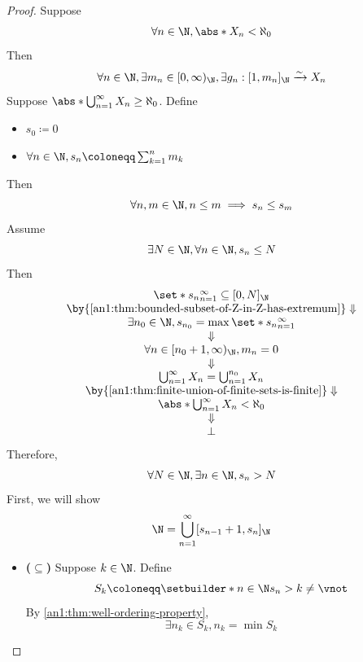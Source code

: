 \begin{proof}
  Suppose
  \[
    \forall n \in \N, \abs*{X_{n}} < \aleph_{0}
  \]
  Then
  \[
    \forall n \in \N, \exists m_{n} \in [0, \infty)_{\N}, \exists g_{n}: [1, m_{n}]_{\N} \xrightarrow{\sim} X_{n}
  \]
  Suppose $\abs*{\bigcup_{n = 1}^{\infty} X_{n}} \geq \aleph_{0}$. Define
  \begin{itemize}
    \item $s_{0} \coloneqq 0$
    \item $\forall n \in \N, s_{n} \coloneqq \sum_{k = 1}^{n} m_{k}$
  \end{itemize}
  Then
  \[
    \forall n, m \in \N, n \leq m \implies s_{n} \leq s_{m}
  \]
  Assume
  \[
    \exists N \in \N, \forall n \in \N, s_{n} \leq N
  \]
  Then
  \[
    \begin{array}{c}
      \set*{s_{n}}_{n = 1}^{\infty} \subseteq [0, N]_{\N}                  \\
      \by{\Cref{an1:thm:bounded-subset-of-Z-in-Z-has-extremum}} \Downarrow \\
      \exists n_{0} \in \N, s_{n_{0}} = \max \set*{s_{n}}_{n = 1}^{\infty} \\
      \Downarrow                                                           \\
      \forall n \in [n_{0} + 1, \infty)_{\N}, m_{n} = 0                    \\
      \Downarrow                                                           \\
      \bigcup_{n = 1}^{\infty} X_{n} = \bigcup_{n = 1}^{n_{0}} X_{n}       \\
      \by{\Cref{an1:thm:finite-union-of-finite-sets-is-finite}} \Downarrow \\
      \abs*{\bigcup_{n = 1}^{\infty} X_{n}} < \aleph_{0}                   \\
      \Downarrow                                                           \\
      \bot
    \end{array}
  \]
  Therefore,
  \[
    \forall N \in \N, \exists n \in \N, s_{n} > N
  \]
  First, we will show
  \[
    \N = \bigcup_{n = 1}^{\infty} [s_{n - 1} + 1, s_{n}]_{\N}
  \]
  \begin{itemize}
    \item \textbf{($\subseteq$)} Suppose $k \in \N$.  Define
          \[
            S_{k} \coloneqq \setbuilder*{n \in \N}{s_{n} > k} \neq \vnot
          \]
          By \cref{an1:thm:well-ordering-property},
          \[
            \exists n_{k} \in S_{k}, n_{k} = \min S_{k}
\]
\end{itemize}
\end{proof}
